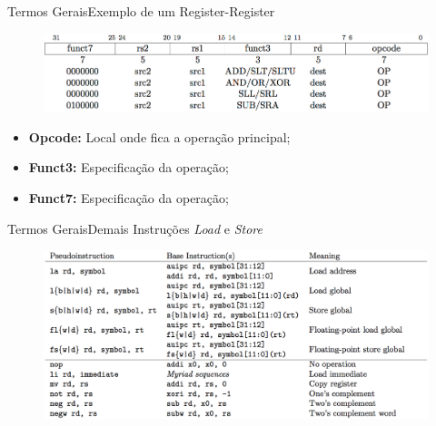 \documentclass[red, aspectratio=169, xcolor=dvipsnames]{beamer}
\let\olditem=\item%
\renewcommand{\item}{\olditem \justifying}
\begin{document}
\begin{frame}{Termos Gerais}{Exemplo de um Register-Register}
	\begin{figure}
		\centering
		\label{fig:}
		\includegraphics[width=1\textwidth]{img/register-register.png}
	\end{figure}
	\begin{itemize}
		\item \textbf{Opcode:} Local onde fica a operação principal;
		\item \textbf{Funct3:} Especificação da operação;
		\item \textbf{Funct7:} Especificação da operação;
	\end{itemize}
\end{frame}

\begin{frame}{Termos Gerais}{Demais Instruções \textit{Load} e \textit{Store}}
	\begin{figure}
		\centering
		\label{fig:real}
		\includegraphics[width=1\textwidth]{img/real.png}
	\end{figure}
\end{frame}
\end{document}
